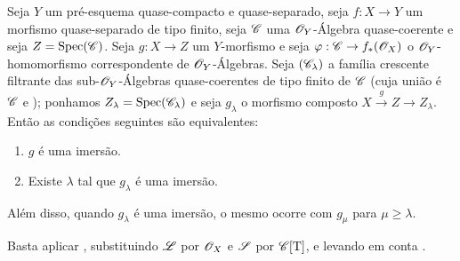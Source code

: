 \begin{lemma}[8.12.2]
\label{IV.8.12.2}
Seja $Y$ um pré-esquema quase-compacto e quase-separado, seja $f:X\to Y$ um morfismo quase-separado de tipo finito, seja $\mathscr{C}$ uma $\mathscr{O}_Y$-Álgebra quase-coerente e seja $Z=\operatorname{Spec}(\mathscr{C})$.
Seja $g:X\to Z$ um $Y$-morfismo e seja $\varphi:\sh{C}\to f_*(\sh{O}_X)$ o $\mathscr{O}_Y$-homomorfismo correspondente de $\mathscr{O}_Y$-Álgebras.
Seja $(\mathscr{C}_\lambda)$ a família crescente filtrante das sub-$\mathscr{O}_Y$-Álgebras quase-coerentes de tipo finito de $\mathscr{C}$ (cuja união é $\mathscr{C}$  e ); ponhamos $Z_\lambda=\operatorname{Spec}(\mathscr{C}_\lambda)$ e seja $g_\lambda$ o morfismo composto $X\xrightarrow{g}Z\to Z_\lambda$.
Então as condições seguintes são equivalentes:
\begin{enumerate}[label=\emph{\alph*)}]
  \item $g$ é uma imersão.
  \item Existe $\lambda$ tal que $g_\lambda$ é uma imersão.
\end{enumerate}
Além disso, quando $g_\lambda$ é uma imersão, o mesmo ocorre com $g_\mu$ para $\mu\geqslant\lambda$.

Basta aplicar , substituindo $\mathscr{L}$ por $\mathscr{O}_X$ e $\mathscr{S}$ por $\mathscr{C}[\mathrm{T}]$, e levando em conta .
\end{lemma}

